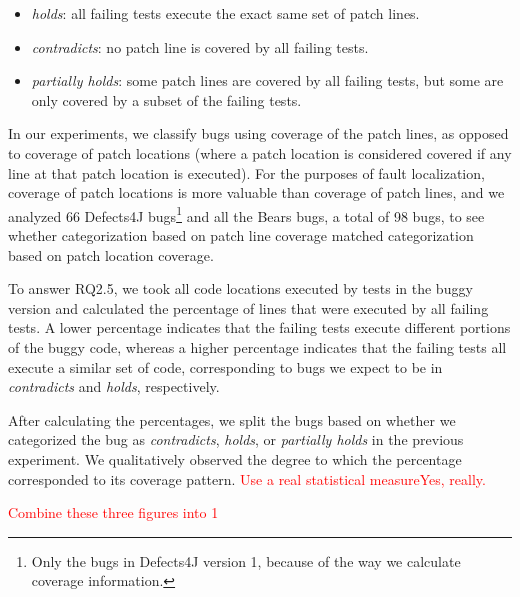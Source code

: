 \documentclass[10pt, conference]{IEEEtran}
\newcommand\todo[1]{\textcolor{red}{#1}}
\begin{document}
\begin{itemize}
\item \emph{holds}:  all failing tests execute the exact same set of patch lines.
\item \emph{contradicts}: no patch line is covered by all failing tests.
\item \emph{partially holds}: some patch lines are covered by all failing tests, but some are only 
covered by a subset of the failing tests.
\end{itemize}

In our experiments, we classify bugs using coverage of the patch lines, as opposed to 
coverage of 
patch locations (where a patch location is considered covered if any line at that patch location 
is 
executed). For the purposes of fault localization, coverage of patch locations is more valuable 
than coverage of patch lines, and we analyzed 66 Defects4J bugs\footnote{Only the 
bugs in Defects4J version 1, because of the way we calculate coverage information.}
 and all the Bears bugs, a total of 98 bugs, to see whether categorization 
based on patch line 
coverage matched categorization based on patch location coverage.

To answer RQ2.5, we took all code locations executed by tests in the buggy version and
calculated the percentage of lines that were executed by all failing tests. 
A lower percentage indicates that the failing tests execute different portions of the buggy 
code, whereas a higher percentage indicates that the failing tests all execute a similar
set of code, corresponding to bugs we expect to be in \emph{contradicts} and \emph{holds},
respectively.

After calculating the percentages, we split the bugs based on whether we categorized the bug 
as \emph{contradicts}, \emph{holds}, or \emph{partially holds} in the previous experiment.
We qualitatively observed the degree to which the percentage corresponded to its coverage 
pattern. \todo{Use a real statistical measure}\todo{Yes, really.}

\todo{Combine these three figures into 1}
\end{document}
